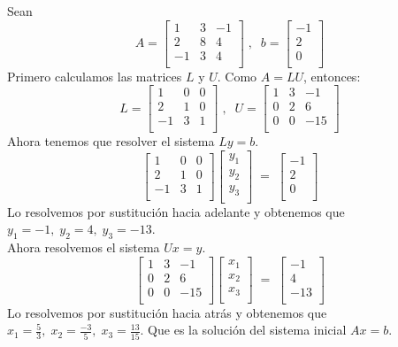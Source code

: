 \begin{ejemplo}
Sean
\[ A = \begin{bmatrix}
1 & 3 & -1 \\
2 & 8 & 4 \\
-1 & 3 & 4 \\
\end{bmatrix} 
\; , \; \;
b = \begin{bmatrix}
-1 \\
2 \\
0 \\
\end{bmatrix}
\]
Primero calculamos las matrices $L$ y $U$. Como $A = LU$, entonces:
\[ L = \begin{bmatrix}
1 & 0 & 0 \\
2 & 1 & 0 \\
-1 & 3 & 1 \\
\end{bmatrix}
\; , \; \;
U = \begin{bmatrix}
1 & 3 & -1 \\
0 & 2 & 6 \\
0 & 0 & -15 \\
\end{bmatrix}
\]
Ahora tenemos que resolver el sistema $Ly = b$.
\[ \begin{bmatrix}
1 & 0 & 0 \\
2 & 1 & 0 \\
-1 & 3 & 1 \\
\end{bmatrix}
\begin{bmatrix}
y_1 \\
y_2 \\
y_3 \\
\end{bmatrix}
\; = \;
\begin{bmatrix}
-1 \\
2 \\
0 \\
\end{bmatrix}
\]
Lo resolvemos por sustitución hacia adelante y obtenemos que $y_1 = -1, \; y_2 = 4, \; y_3 = -13$.\\
Ahora resolvemos el sistema $Ux = y$.
\[ 
\begin{bmatrix}
1 & 3 & -1 \\
0 & 2 & 6 \\
0 & 0 & -15 \\
\end{bmatrix}
\begin{bmatrix}
x_1 \\
x_2 \\
x_3 \\
\end{bmatrix}
\; = \;
\begin{bmatrix}
-1 \\
4 \\
-13 \\
\end{bmatrix}
\]
Lo resolvemos por sustitución hacia atrás y obtenemos que $x_1 = \frac{5}{3}, \; x_2 = \frac{-3}{5}, \; x_3 = \frac{13}{15}$. Que es la solución del sistema inicial $Ax = b$.
\end{ejemplo}

